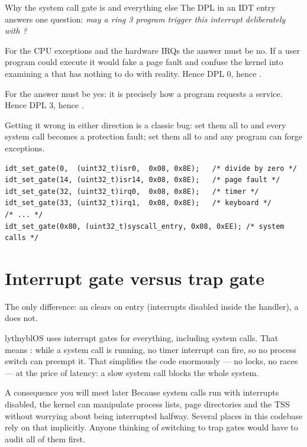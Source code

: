 \begin{concept}{Why the system call gate is  and everything else }
The DPL in an IDT entry answers one question: \emph{may a ring 3 program trigger this interrupt
deliberately with ?}

For the CPU exceptions and the hardware IRQs the answer must be no. If a user program could execute
 it would fake a page fault and confuse the kernel into examining a  that has
nothing to do with reality. Hence DPL 0, hence .

For  the answer must be yes: it is precisely how a program requests a service. Hence
DPL 3, hence .

 Getting it wrong in either direction is a classic bug: set them
all to  and every system call becomes a protection fault; set them all to  and
any program can forge exceptions.
\end{concept}

\begin{lstlisting}[style=c]
idt_set_gate(0,  (uint32_t)isr0,  0x08, 0x8E);   /* divide by zero */
idt_set_gate(14, (uint32_t)isr14, 0x08, 0x8E);   /* page fault */
idt_set_gate(32, (uint32_t)irq0,  0x08, 0x8E);   /* timer */
idt_set_gate(33, (uint32_t)irq1,  0x08, 0x8E);   /* keyboard */
/* ... */
idt_set_gate(0x80, (uint32_t)syscall_entry, 0x08, 0xEE); /* system calls */
\end{lstlisting}

\section{Interrupt gate versus trap gate}

The only difference: an  clears  on entry (interrupts disabled inside
the handler), a  does not.

lytlnyblOS uses interrupt gates for everything, including system calls. That means : while a system call is running, no timer interrupt can fire, so no
process switch can preempt it. That simplifies the code enormously --- no locks, no races --- at
the price of latency: a slow system call blocks the whole system.

\begin{warn}{A consequence you will meet later}
Because system calls run with interrupts disabled, the kernel can manipulate process lists,
page directories and the TSS without worrying about being interrupted halfway. Several places in
this codebase rely on that implicitly. Anyone thinking of switching to trap gates would have to
audit all of them first.
\end{warn}

